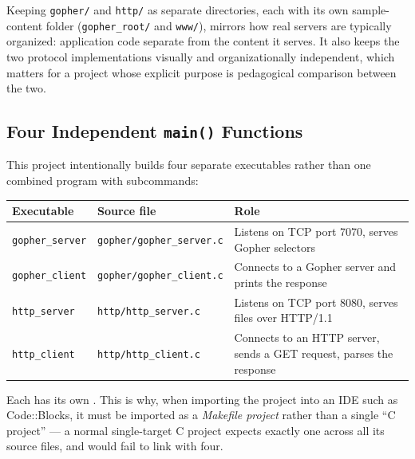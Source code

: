 Keeping \texttt{gopher/} and \texttt{http/} as separate directories, each with its own sample-content folder (\texttt{gopher\_root/} and \texttt{www/}), mirrors how real servers are typically organized: application code separate from the content it serves. It also keeps the two protocol implementations visually and organizationally independent, which matters for a project whose explicit purpose is pedagogical comparison between the two.

\subsection{Four Independent \texttt{main()} Functions}

This project intentionally builds four separate executables rather than one combined program with subcommands:

\begin{center}
\begin{tabularx}{\textwidth}{l l X}
\toprule
\textbf{Executable} & \textbf{Source file} & \textbf{Role} \\
\midrule
\texttt{gopher\_server} & \texttt{gopher/gopher\_server.c} & Listens on TCP port 7070, serves Gopher selectors \\
\texttt{gopher\_client} & \texttt{gopher/gopher\_client.c} & Connects to a Gopher server and prints the response \\
\texttt{http\_server} & \texttt{http/http\_server.c} & Listens on TCP port 8080, serves files over HTTP/1.1 \\
\texttt{http\_client} & \texttt{http/http\_client.c} & Connects to an HTTP server, sends a GET request, parses the response \\
\bottomrule
\end{tabularx}
\end{center}

Each has its own . This is why, when importing the project into an IDE such as Code::Blocks, it must be imported as a \emph{Makefile project} rather than a single ``C project'' --- a normal single-target C project expects exactly one  across all its source files, and would fail to link with four.
